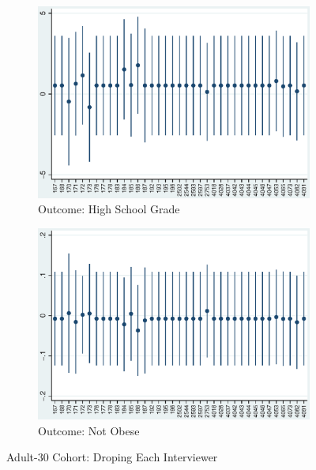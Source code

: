     \begin{figure}[H]
      \centering
        \begin{subfigure}[t]{0.81\textwidth}
          \includegraphics[width=\textwidth]{../../../output/image/coef-interviewer-adult30-votoMaturita.eps}       
\caption{Outcome: High School Grade}        
        \end{subfigure}
        \begin{subfigure}[t]{0.81\textwidth}
          \includegraphics[width=\textwidth]{../../../output/image/coef-interviewer-adult30-BMI_obese.eps}       
 \caption{Outcome: Not Obese}        
        \end{subfigure}
      \caption{Adult-30 Cohort: Droping Each Interviewer}  \label{fig:adult30-sensitivity-interviewer}
    \end{figure}


